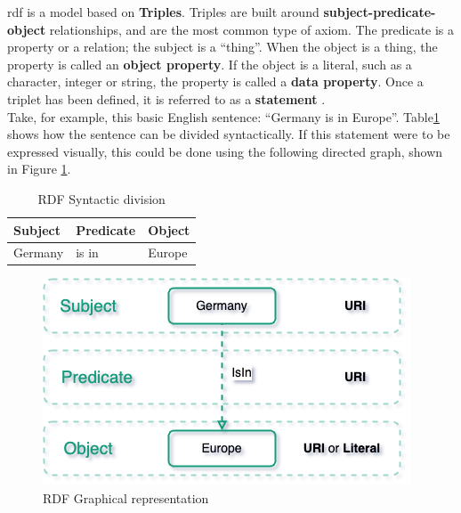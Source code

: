     \acrshort{rdf} is a model based on \textbf{Triples}. Triples are built around \textbf{subject-predicate-object} relationships, and are the most common type of axiom. The predicate is a property or a relation; the subject is a “thing”. When the object is a thing, the property is called an \textbf{object property}. If the object is a literal, such as a character, integer or string, the property is called a \textbf{data property}. Once a triplet has been defined, it is referred to as a \textbf{statement} \cite{noy2001ontology}.\\

    Take, for example, this basic English sentence: “Germany is in Europe”. Table\ref{tab:rdf-example} shows how the sentence can be divided syntactically. If this statement were to be expressed visually, this could be done using the following directed graph, shown in Figure \ref{fig:rdf-example}.\\
    
    \begin{table}[h]
        \centering
	    \begin{tabular}{ | m{4cm} | m{4cm} | m{4cm} | }
            \hline
            \rowcolor{teal!30} Subject & Predicate & Object \\
            
            \hline
            Germany  & is in & Europe\\
            
            \hline
        \end{tabular}
        \caption{\label{tab:rdf-example} RDF Syntactic division}
        \end{table}
        
    \begin{figure}[h]
        \centering
        \includegraphics[scale=0.6]{images/Foundation-RDF Example.drawio.png}
        \caption{\label{fig:rdf-example}  RDF Graphical representation}
    \end{figure}

